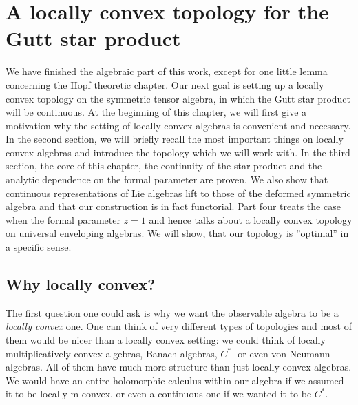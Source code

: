 
%
%

\chapter{A locally convex topology for the Gutt star product}

We have finished the algebraic part of this work, except for one little 
lemma concerning the Hopf theoretic chapter. Our next goal is setting up a 
locally convex topology on the symmetric tensor algebra, in which the Gutt 
star product will be continuous. At the beginning of this chapter, we will 
first give a motivation why the setting of locally convex algebras is 
convenient and necessary. In the second section, we will briefly recall the 
most important things on locally convex algebras and introduce the topology 
which we will work with. In the third section, the core of this chapter, the 
continuity of the star product and the analytic dependence on the formal 
parameter are proven. We also show that continuous representations of Lie 
algebras lift to  those of the deformed symmetric algebra and that our 
construction is in fact functorial. Part four treats the case when the formal 
parameter $z = 1$ and hence talks about a locally convex topology on universal 
enveloping algebras. We will show, that our topology is ''optimal'' in a 
specific sense.



\section{Why locally convex?}
\label{sec:chap5_Prelim}

The first question one could ask is why we want the observable algebra 
to be a \textit{locally convex} one. One can think of very different types of 
topologies and most of them would be nicer than a locally convex setting: we 
could think of locally multiplicatively convex algebras, Banach algebras, 
$C^*$- or even von Neumann algebras. All of them have much more structure than 
just locally convex algebras. We would have an entire holomorphic calculus 
within our algebra if we assumed it to be locally m-convex, or even a 
continuous one if we wanted it to be $C^*$.


